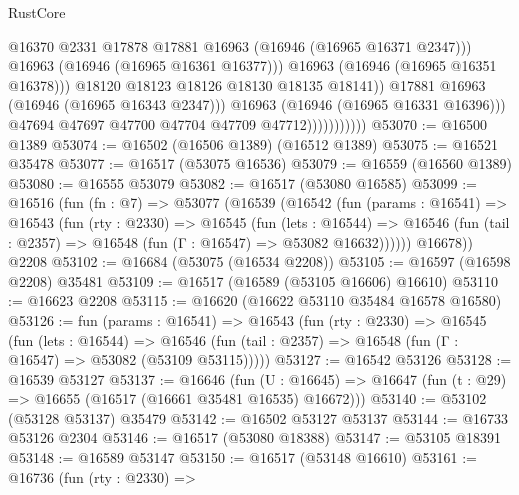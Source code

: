 \begin{lexlean}{RustCore}
\begin{coremodule}
                                        @16370
                                        @2331
                                        @17878
                                        @17881
                                        @16963
                                        (@16946 (@16965 @16371 @2347)))
                                      @16963
                                      (@16946 (@16965 @16361 @16377)))
                                    @16963
                                    (@16946 (@16965 @16351 @16378)))
                                  @18120
                                  @18123
                                  @18126
                                  @18130
                                  @18135
                                  @18141))
                              @17881
                              @16963
                              (@16946 (@16965 @16343 @2347)))
                            @16963
                            (@16946 (@16965 @16331 @16396)))
                          @47694
                          @47697
                          @47700
                          @47704
                          @47709
                          @47712)))))))))))
@53070 := @16500 @1389
@53074 := @16502 (@16506 @1389) (@16512 @1389)
@53075 := @16521 @35478
@53077 := @16517 (@53075 @16536)
@53079 := @16559 (@16560 @1389)
@53080 := @16555 @53079
@53082 := @16517 (@53080 @16585)
@53099 := @16516
    (fun (fn : @7) =>
    @53077
      (@16539
        (@16542
          (fun (params : @16541) =>
          @16543
            (fun (rty : @2330) =>
            @16545
              (fun (lets : @16544) =>
              @16546 (fun (tail : @2357) => @16548 (fun (Γ : @16547) => @53082 @16632))))))
        @16678))
    @2208
@53102 := @16684 (@53075 (@16534 @2208))
@53105 := @16597 (@16598 @2208) @35481
@53109 := @16517 (@16589 (@53105 @16606) @16610)
@53110 := @16623 @2208
@53115 := @16620 (@16622 @53110 @35484 @16578 @16580)
@53126 := fun (params : @16541) =>
  @16543
    (fun (rty : @2330) =>
    @16545
      (fun (lets : @16544) =>
      @16546 (fun (tail : @2357) => @16548 (fun (Γ : @16547) => @53082 (@53109 @53115)))))
@53127 := @16542 @53126
@53128 := @16539 @53127
@53137 := @16646
    (fun (U : @16645) => @16647 (fun (t : @29) => @16655 (@16517 (@16661 @35481 @16535) @16672)))
@53140 := @53102 (@53128 @53137) @35479
@53142 := @16502 @53127 @53137
@53144 := @16733 @53126 @2304
@53146 := @16517 (@53080 @18388)
@53147 := @53105 @18391
@53148 := @16589 @53147
@53150 := @16517 (@53148 @16610)
@53161 := @16736
    (fun (rty : @2330) =>

\end{coremodule}
\end{lexlean}
